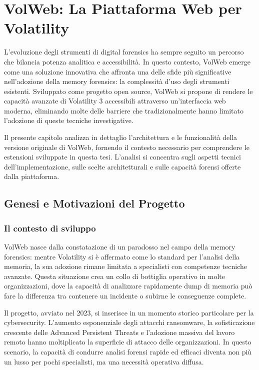 \chapter{VolWeb: La Piattaforma Web per Volatility}

L'evoluzione degli strumenti di digital forensics ha sempre seguito un percorso che bilancia potenza analitica e accessibilità. In questo contesto, VolWeb emerge come una soluzione innovativa che affronta una delle sfide più significative nell'adozione della memory forensics: la complessità d'uso degli strumenti esistenti. Sviluppato come progetto open source, VolWeb si propone di rendere le capacità avanzate di Volatility 3 accessibili attraverso un'interfaccia web moderna, eliminando molte delle barriere che tradizionalmente hanno limitato l'adozione di queste tecniche investigative.

Il presente capitolo analizza in dettaglio l'architettura e le funzionalità della versione originale di VolWeb, fornendo il contesto necessario per comprendere le estensioni sviluppate in questa tesi. L'analisi si concentra sugli aspetti tecnici dell'implementazione, sulle scelte architetturali e sulle capacità forensi offerte dalla piattaforma.

\section{Genesi e Motivazioni del Progetto}

\subsection{Il contesto di sviluppo}

VolWeb \cite{volweb2024} nasce dalla constatazione di un paradosso nel campo della memory forensics: mentre Volatility si è affermato come lo standard per l'analisi della memoria, la sua adozione rimane limitata a specialisti con competenze tecniche avanzate. Questa situazione crea un collo di bottiglia operativo in molte organizzazioni, dove la capacità di analizzare rapidamente dump di memoria può fare la differenza tra contenere un incidente o subirne le conseguenze complete.

Il progetto, avviato nel 2023, si inserisce in un momento storico particolare per la cybersecurity. L'aumento esponenziale degli attacchi ransomware, la sofisticazione crescente delle Advanced Persistent Threats e l'adozione massiva del lavoro remoto hanno moltiplicato la superficie di attacco delle organizzazioni. In questo scenario, la capacità di condurre analisi forensi rapide ed efficaci diventa non più un lusso per pochi specialisti, ma una necessità operativa diffusa.

